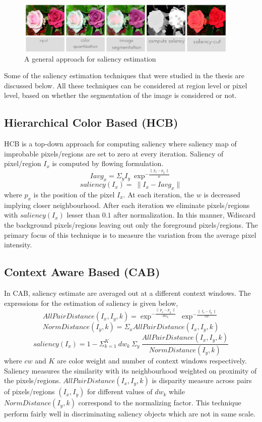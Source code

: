 \begin{figure}[htpb]
   \begin{center}
	    \includegraphics[width=0.95\textwidth]{snaps/sal/saliency.eps}     
     \caption {A general approach for saliency estimation}
   \label{fig:salap}
   \end{center}
 \end{figure}

\par Some of the saliency estimation techniques that were studied in the thesis are discussed below. All these techniques can be considered at region level or pixel level, based on whether the segmentation of the image is considered or not.

\subsection{Hierarchical Color Based (HCB)}
HCB is a top-down approach for computing saliency where saliency map of improbable pixels/regions are set to zero at every iteration. Saliency of pixel/region $I_{x}$ is computed by flowing formulation. 
$$ Iavg_{x} = \Sigma_{y} I_{y}~\exp^{-\frac{\parallel~p_{x} - p_{y}~\parallel}{w}}  $$
$$ saliency(I_{x}) =~\parallel I_{x} - Iavg_{x} \parallel $$
where $p_{x}$ is the position of the pixel $I_{x}$. At each iteration, the $w$ is decreased implying closer neighbourhood. After each iteration we eliminate pixels/regions with $ saliency(I_{x})$ lesser than $0.1$ after normalization. In this manner, Wdiscard the background pixels/regions leaving out only the foreground pixels/regions. The primary focus of this technique is to measure the variation from the average pixel intensity.

\subsection{Context Aware Based (CAB)}
In CAB, saliency estimate are averaged out at a different context windows. The expressions for the estimation of saliency is given below,
$$ AllPairDistance(I_{x},I_{y},k) = \exp^{-\frac{\parallel~p_x - p_y~\parallel}{dw_k}}~\exp^{-\frac{\parallel~I_{x} - I_{y}~\parallel}{cw}}$$
$$ NormDistance(I_{y},k) = \Sigma_{x} AllPairDistance(I_{x},I_{y},k)$$
$$ saliency(I_{x}) = 1- \Sigma^{K}_{k=1}~dw_{k}~\Sigma_{y}~\frac{AllPairDistance(I_{x},I_{y},k)}{NormDistance(I_{y},k)}$$
where $cw$ and $K$ are color weight and number of context windows respectively. Saliency measures the similarity with its neighbourhood weighted on proximity of the pixels/regions. $AllPairDistance(I_{x},I_{y},k)$ is disparity measure across pairs of pixels/regions $(I_{x},I_{y})$ for different values of $dw_{k}$ while $NormDistance(I_{y},k)$ correspond to the normalizing factor.
This technique perform fairly well in discriminating saliency objects which are not in same scale.

